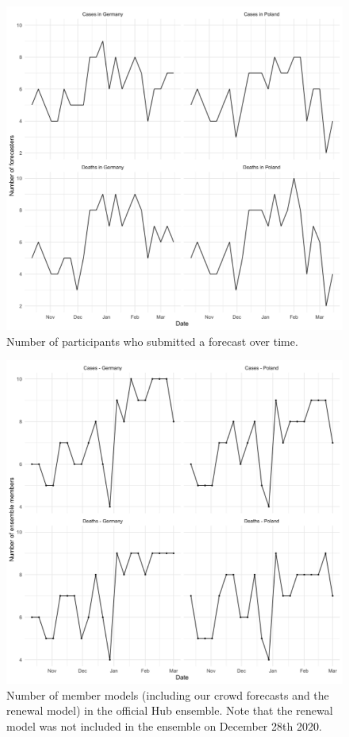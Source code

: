 \documentclass[10pt,letterpaper]{article} %
\begin{document}
\begin{figure}[H]
\includegraphics[width=1\linewidth,]{../analysis/plots/number-forecasters} \caption{Number of participants who submitted a forecast over time.}\label{fig:num-forecasters}
\end{figure}

\begin{figure}[H]
\includegraphics[width=1\linewidth,]{../analysis/plots/ensemble-members} \caption{Number of member models (including our crowd forecasts and the renewal model) in the official Hub ensemble. Note that the renewal model was not included in the ensemble on December 28th 2020.}\label{fig:num-ensemble-members}
\end{figure}
\end{document}
